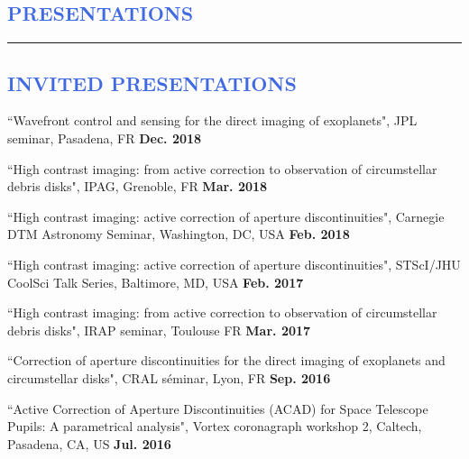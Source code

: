\documentclass[12pt]{article}
\begin{document}
%
%
\vspace{-0.9cm}
\textcolor{RoyalBlue}{\section{\large PRESENTATIONS}
\vspace{-0.35cm}\hrule}
\vspace{0.45cm}

\textcolor{RoyalBlue}{\subsection{INVITED PRESENTATIONS}}
\begin{etaremune}
\item ``Wavefront control and sensing for the direct imaging of exoplanets", JPL seminar, Pasadena, FR \textbf{Dec. 2018}

\item ``High contrast imaging: from active correction to observation of circumstellar debris disks", IPAG, Grenoble, FR \textbf{Mar. 2018}

\item ``High contrast imaging: active correction of aperture discontinuities", Carnegie DTM Astronomy Seminar, Washington, DC, USA \textbf{Feb. 2018}

\item ``High contrast imaging: active correction of aperture discontinuities", STScI/JHU CoolSci Talk Series, Baltimore, MD, USA \textbf{Feb. 2017}

\item ``High contrast imaging: from active correction to observation of circumstellar debris disks", IRAP seminar, Toulouse FR \textbf{Mar. 2017}

\item ``Correction of aperture discontinuities for the direct imaging of exoplanets and circumstellar disks", CRAL séminar, Lyon, FR \textbf{Sep. 2016}

\item ``Active Correction of Aperture Discontinuities (ACAD) for Space Telescope Pupils: A parametrical analysis", Vortex coronagraph workshop 2, Caltech, Pasadena, CA, US \textbf{Jul. 2016}
\end{etaremune}
\end{document}
